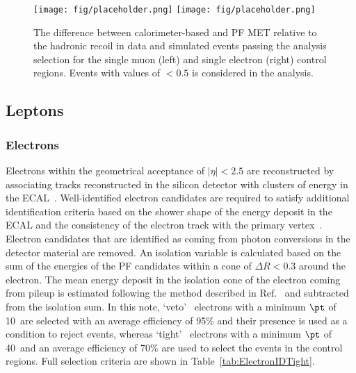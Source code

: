 \begin{figure}[htbp]
  \centering
        \texttt{[image: fig/placeholder.png]}
        \texttt{[image: fig/placeholder.png]}
  \caption{The difference between calorimeter-based and PF MET relative to the hadronic recoil
in data and simulated events passing the analysis selection for the single muon (left) and
single electron (right) control regions. Events with values of $< 0.5$ is considered in
the analysis.}
  \label{fig:calomet_pfmet}
\end{figure}

\subsection{Leptons}

\subsubsection{Electrons}

Electrons within the geometrical acceptance of $|\eta| < 2.5$
are reconstructed by associating tracks reconstructed
in the silicon detector with clusters of energy in the ECAL~\cite{Khachatryan:2015hwa}.
Well-identified electron candidates are required to satisfy
additional identification criteria based on the shower
shape of the energy deposit in the ECAL and the consistency of the
electron track with the primary vertex~\cite{TRK-11-001}. Electron candidates
that are identified as coming from photon conversions in
the detector material are removed. An isolation variable is calculated based on the sum of the energies of the PF candidates within a cone of $\Delta R < 0.3$ around the electron. The mean energy deposit in the isolation cone of the electron coming from pileup is estimated following the method described in Ref.~\cite{Khachatryan:2015hwa} and subtracted from the isolation sum. In this note, `veto'~\cite{CMS-EGM-TWIKI-ELEID} electrons with a
minimum $\pt$ of 10~\GeV are selected with an average efficiency of 95\% and their presence is used as a condition to reject events, whereas `tight'~\cite{CMS-EGM-TWIKI-ELEID} electrons with a minimum $\pt$ of 40~\GeV and an average efficiency of 70\% are used to select the events
in the control regions. Full selection criteria are shown in Table~\ref{tab:ElectronIDTight}.

